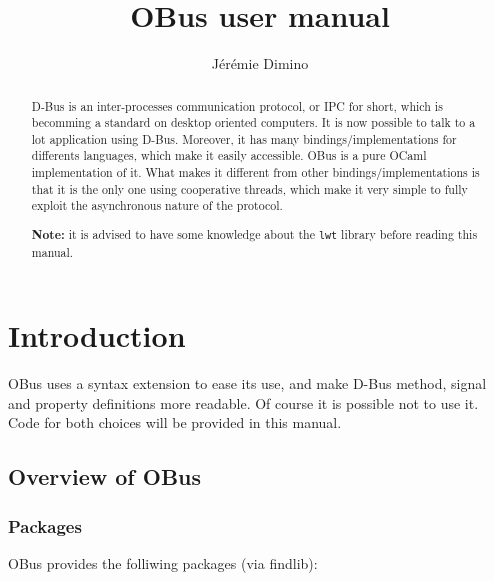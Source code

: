 \documentclass{article}
\title{OBus user manual}
\author{Jérémie Dimino}
\begin{document}
\maketitle

\begin{abstract}
  D-Bus is an inter-processes communication protocol, or IPC for
  short, which is becomming a standard on desktop oriented
  computers. It is now possible to talk to a lot application using
  D-Bus. Moreover, it has many bindings/implementations for differents
  languages, which make it easily accessible. OBus is a pure OCaml
  implementation of it. What makes it different from other
  bindings/implementations is that it is the only one using
  cooperative threads, which make it very simple to fully exploit the
  asynchronous nature of the protocol.

  \textbf{Note:} it is advised to have some knowledge about the
  \texttt{lwt} library before reading this manual.
\end{abstract}


\setcounter{tocdepth}{2}
\tableofcontents

\section{Introduction}

OBus uses a syntax extension to ease its use, and make D-Bus method,
signal and property definitions more readable. Of course it is
possible not to use it. Code for both choices will be provided in this
manual.

\subsection{Overview of OBus}

\subsubsection{Packages}

OBus provides the folliwing packages (via findlib):
\end{document}
